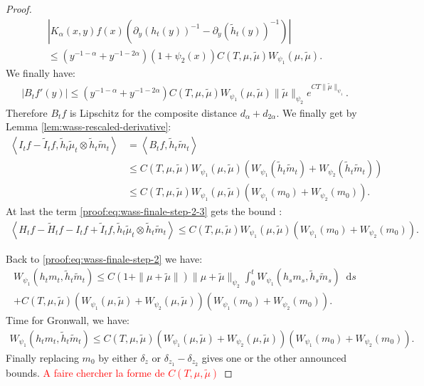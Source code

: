 \documentclass[11pt,a4paper]{article}
\newcommand{\red}[1]{\textcolor{red}{#1}}
\newcommand{\brac}[1]{\left\langle#1\right\rangle}
\newcommand{\dd}{\mathop{}\!\mathrm{d}}
\begin{document}
\begin{proof}
    \begin{multline*}
        \left| K_\alpha(x,y) f(x)\left( \partial_y \left(h_t(y) \right)^{-1} - \partial_y \left(\tilde{h}_t(y) \right)^{-1} \right) \right| \\
        \leq (y^{-1-\alpha} + y^{-1-2\alpha})(1 + \psi_2(x)) C(T,\mu,\tilde{\mu})  W_{\psi_1}(\mu,\tilde{\mu}).
    \end{multline*}
    We finally have:
    \begin{align*}
        \left| B_tf'(y)\right| \leq (y^{-1-\alpha} + y^{-1-2\alpha})C(T,\mu,\tilde{\mu})  W_{\psi_1}(\mu,\tilde{\mu}) \|\tilde{\mu}\|_{\psi_2} e^{CT\|\tilde{\mu}\|_{\psi_1}}.
    \end{align*}
    Therefore $B_tf$ is Lipschitz for the composite distance $d_\alpha + d_{2\alpha}$. We finally get by Lemma \ref{lem:wass-rescaled-derivative}:
    \begin{align*}
        \brac{I_tf - \tilde{I}_tf, \tilde{h}_t\tilde{\mu}_t\otimes \tilde{h}_t\tilde{m}_t} 
        &= \brac{B_tf,\tilde{h}_t\tilde{m}_t} \\
        &\leq C(T,\mu,\tilde{\mu}) W_{\psi_1}(\mu,\tilde{\mu}) \left(W_{\psi_1}(\tilde{h}_t\tilde{m}_t) + W_{\psi_2}(\tilde{h}_t\tilde{m}_t) \right)\\
        &\leq C(T,\mu,\tilde{\mu}) W_{\psi_1}(\mu,\tilde{\mu})\left(W_{\psi_1}(m_0) + W_{\psi_2}(m_0) \right).
    \end{align*}
    At last the term \eqref{proof:eq:wass-finale-step-2-3} gets the bound :
    \begin{align*}
        \brac{H_tf - \tilde{H}_tf - I_tf + \tilde{I}_tf, \tilde{h}_t\tilde{\mu}_t\otimes \tilde{h}_t\tilde{m}_t} 
        \leq C(T,\mu,\tilde{\mu}) W_{\psi_1}(\mu,\tilde{\mu})\left(W_{\psi_1}(m_0) + W_{\psi_2}(m_0) \right).
    \end{align*}

    Back to \eqref{proof:eq:wass-finale-step-2} we have:
    \begin{multline*}
        W_{\psi_1}\left(h_t m_t , \tilde{h}_t \tilde{m}_t \right) \leq C(1 + \|\mu + \tilde{\mu}\|)\|\mu + \tilde{\mu}\|_{\psi_2}\int_0^t W_{\psi_1}\left(h_s m_s , \tilde{h}_s \tilde{m}_s \right) \dd s \\
        + C(T,\mu,\tilde{\mu})\left(W_{\psi_1}\left( \mu , \tilde{\mu}\right) + W_{\psi_2}\left( \mu , \tilde{\mu}\right)\right)\left(W_{\psi_1}(m_0) + W_{\psi_2}(m_0) \right).
    \end{multline*}
    Time for Gronwall, we have:
    \begin{align*}
        W_{\psi_1}\left(h_t m_t , \tilde{h}_t \tilde{m}_t \right) \leq C(T,\mu,\tilde{\mu})\left(W_{\psi_1}\left( \mu , \tilde{\mu}\right) + W_{\psi_2}\left( \mu , \tilde{\mu}\right)\right)\left(W_{\psi_1}(m_0) + W_{\psi_2}(m_0) \right).
    \end{align*}
    Finally replacing $m_0$ by either $\delta_z$ or $\delta_{z_1} - \delta_{z_2}$ gives one or the other announced bounds.
    \red{A faire chercher la forme de $C(T,\mu,\tilde{\mu})$}
\end{proof}
\end{document}
